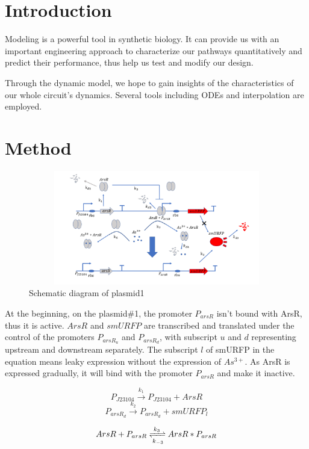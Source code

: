 \section{Introduction}
Modeling is a powerful tool in synthetic biology. It can provide us with an important engineering approach to characterize our pathways quantitatively and predict their performance, thus help us test and modify our design.

Through the dynamic model, we hope to gain insights of the characteristics of our whole circuit's dynamics. Several tools including ODEs and interpolation are employed.


\section{Method}

\begin{figure}[h]
\centering
\includegraphics[width=12cm,height=5cm]{1}
\caption{Schematic diagram of plasmid1}
\end{figure}

At the beginning, on the plasmid\#1, the promoter $P_{arsR}$ isn't bound with ArsR, thus it is active. $ArsR$ and $smURFP$ are transcribed and translated under the control of the promoters $P_{arsR_u}$ and $P_{arsR_d}$, with subscript $u$ and $d$ representing upstream and downstream separately. The subscript $l$ of smURFP in the equation means leaky expression without the expression of $As^{3+}$. As ArsR is expressed gradually, it will bind with the promoter $P_{arsR}$ and make it inactive. \cite{pola2018novel}

\begin{equation}
P_{J23104} \stackrel{k_1}{\longrightarrow} P_{J23104}+ArsR
\end{equation}
\begin{equation}
P_{arsR_d} \stackrel{k_2}{\longrightarrow} P_{arsR_d} +smURFP_l
\end{equation}

\begin{equation}
ArsR+P_{arsR} \xrightleftharpoons[k_{-3}]{k_3}ArsR*P_{arsR} 
\end{equation} 

